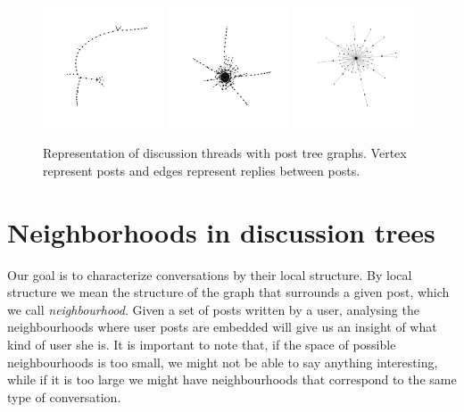 \documentclass[smallextended]{svjour3}          %
\begin{document}
\begin{figure}
	\centering
	\includegraphics[width=0.32\textwidth]{tree1}
	\includegraphics[width=0.32\textwidth]{tree2}
	\includegraphics[width=0.32\textwidth]{tree3}
	\caption{Representation of discussion threads with post tree graphs. Vertex represent posts and edges represent replies between posts.}
	\label{fig:trees}
\end{figure}

\section{Neighborhoods in discussion trees}

Our goal is to characterize conversations by their local structure. By local structure we mean the structure of the graph that surrounds a given post, which we call \textit{neighbourhood}. Given a set of posts written by a user, analysing the neighbourhoods where user posts are embedded will give us an insight of what kind of user she is. It is important to note that, if the space of possible neighbourhoods is too small, we might not be able to say anything interesting, while if it is too large we might have neighbourhoods that correspond to the same type of conversation.
\end{document}
